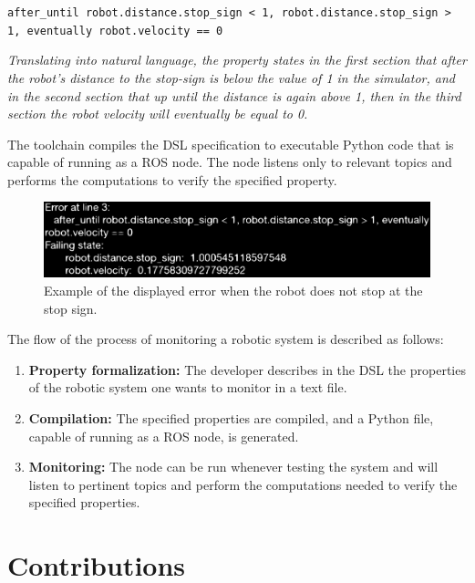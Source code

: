 \texttt{after\_until robot.distance.stop\_sign < 1, robot.distance.stop\_sign > 1, eventually robot.velocity == 0}

\textit{Translating into natural language, the property states in the first section that after the robot's distance to the stop-sign is below the value of 1 in the simulator, and in the second section that up until the distance is again above 1, then in the third section the robot velocity will eventually be equal to 0.}

The toolchain compiles the DSL specification to executable Python code that is capable of running as a ROS node. The node listens only to relevant topics and performs the computations to verify the specified property.

\begin{figure}
\includegraphics[width=\textwidth]{images/error.eps}
\caption{Example of the displayed error when the robot does not stop at the stop sign.} \label{fig:error}
\end{figure}

The flow of the process of monitoring a robotic system is described as follows:

\begin{enumerate}[label=(\roman*)]
    \item \textbf{Property formalization:} The developer describes in the DSL the properties of the robotic system one wants to monitor in a text file.
    \item \textbf{Compilation:} The specified properties are compiled, and a Python file, capable of running as a ROS node, is generated.
    \item \textbf{Monitoring:} The node can be run whenever testing the system and will listen to pertinent topics and perform the computations needed to verify the specified properties.
\end{enumerate}


\section{Contributions}
\label{sec:contributions}

